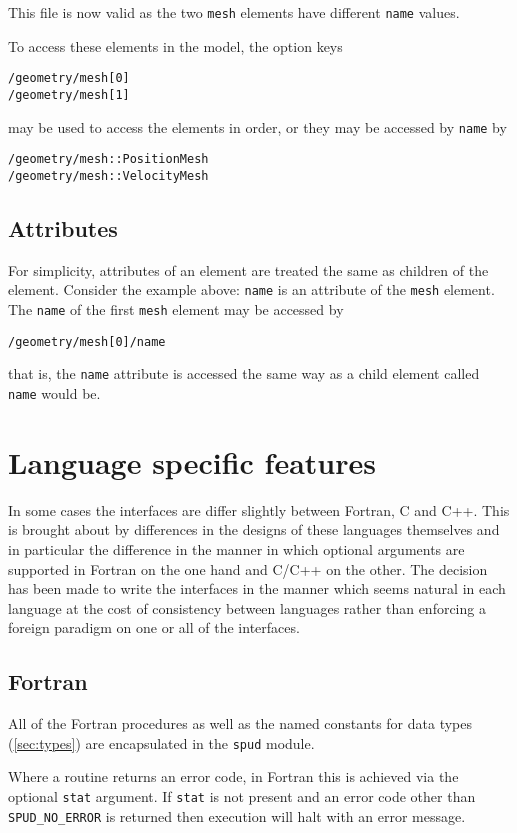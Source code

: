 \documentclass[a4paper, 11pt]{book}
\newcommand{\stat}{\lstinline[language=fortran]+stat+\xspace}
\begin{document}
This file is now valid as the two \verb+mesh+ elements have different
\verb+name+ values.

To access these elements in the model, the option keys
\begin{verbatim}
/geometry/mesh[0]
/geometry/mesh[1]
\end{verbatim}
may be used to access the elements in order, or they may be accessed
by \verb+name+ by
\begin{verbatim}
/geometry/mesh::PositionMesh
/geometry/mesh::VelocityMesh
\end{verbatim}

\subsection{Attributes}
For simplicity, attributes of an element are treated the same as children
of the element. Consider the example above: \verb+name+ is an attribute
of the \verb+mesh+ element. The \verb+name+ of the first \verb+mesh+ element
may be accessed by
\begin{verbatim}
/geometry/mesh[0]/name
\end{verbatim}
that is, the \verb+name+ attribute is accessed the same way as a child element
called \verb+name+ would be.

\section{Language specific features}

In some cases the interfaces are differ slightly between Fortran, C and C++.
This is brought about by differences in the designs of these languages
themselves and in particular the difference in the manner in which optional
arguments are supported in Fortran on the one hand and C/C++ on the other.
The decision has been made to write the interfaces in the manner which seems
natural in each language at the cost of consistency between languages rather
than enforcing a foreign paradigm on one or all of the interfaces.

\subsection{Fortran}

All of the Fortran procedures as well as the named constants for data types
(\ref{sec:types}) are encapsulated in the \lstinline+spud+ module.

Where a routine returns an error code, in Fortran this is achieved via the
optional \stat argument. If \stat is not present and an error code other
than \lstinline[language=fortran]+SPUD_NO_ERROR+ is returned then execution
will halt with an error message.
\end{document}
